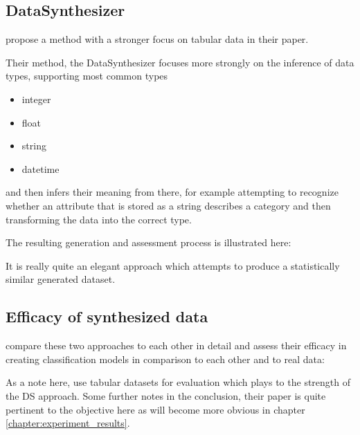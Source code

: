 \pagebreak

\subsection{DataSynthesizer}
\label{subsection:datasynthesizer}

\cite{ping2017datasynthesizer} propose a method with a stronger focus on tabular data in their paper.

Their method, the DataSynthesizer focuses more strongly on the inference of data types, supporting most common types

\begin{itemize}
	\item integer
	\item float
	\item string
	\item datetime
\end{itemize} 

and then infers their meaning from there, for example attempting to recognize whether an attribute that is stored as a string describes a category and then transforming the data into the correct type.

\pagebreak

The resulting generation and assessment process is illustrated here:


It is really quite an elegant approach which attempts to produce a statistically similar generated dataset.

\clearpage

\subsection{Efficacy of synthesized data}

\label{subsection:efficacy}

\cite{ares_utility} compare these two approaches to each other in detail and assess their efficacy in creating classification models in comparison to each other and to real data:


As a note here, \cite{ares_utility} use tabular datasets for evaluation which plays to the strength of the \ac{DS} approach. Some further notes in the conclusion, their paper is quite pertinent to the objective here as will become more obvious in chapter \ref{chapter:experiment_results}.

